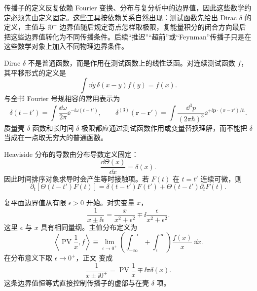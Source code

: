
传播子的定义反复依赖 Fourier 变换、分布与复分析中的边界值，因此这些数学约定必须先由定义固定。这些工具按依赖关系自然出现：测试函数先给出 Dirac $\delta$ 的定义，主值与 $\ii0^+$ 边界值随后规定奇点怎样取极限，复能量积分的闭合方向最后把这些边界值转化为不同传播条件。后续“推迟”“超前”或“Feynman”传播子只是在这些数学对象上加入不同物理边界条件。

Dirac $\delta$ 不是普通函数，而是作用在测试函数上的线性泛函。对连续测试函数 $f$，其平移形式的定义是
\begin{equation}
 \boxed{
 \int\dd y\,\delta(x-y)f(y)=f(x).}
 \label{eq:delta-def-action-r13}
\end{equation}
与全书 Fourier 号规相容的常用表示为
\begin{equation}
 \boxed{
 \delta(t-t')
 =\int\frac{\dd\omega}{2\pi}\ee^{-\ii\omega(t-t')},
 \qquad
 \delta^{(3)}(\mathbf r-\mathbf r')
 =\int\frac{\dd^3 p}{(2\pi\hbar)^3}
 \ee^{+\ii\mathbf p\cdot(\mathbf r-\mathbf r')/\hbar}.}
 \label{eq:delta-fourier-representation-dp68}
\end{equation}
质量壳 $\delta$ 函数和长时间 $\delta$ 极限都应通过测试函数作用或变量替换理解，而不能把 $\delta$ 当成在一点取无穷大的普通函数。

Heaviside 分布的导数由分布导数定义固定：
\begin{equation}
 \boxed{\frac{\dd\Theta(x)}{\dd x}=\delta(x).}
 \label{eq:heaviside-delta-dp68}
\end{equation}
因此时间排序对象求导时会产生等时接触项。若 $F(t)$ 在 $t=t'$ 连续可微，则
\begin{equation}
 \boxed{
 \partial_t[\Theta(t-t')F(t)]
 =\delta(t-t')F(t')
 +\Theta(t-t')\partial_tF(t).}
 \label{eq:theta-product-derivative-dp68}
\end{equation}

复平面边界值从有限 $\epsilon>0$ 开始。对实变量 $x$，
\begin{equation}
 \boxed{
 \frac1{x\pm\ii\epsilon}
 =\frac{x}{x^2+\epsilon^2}
 \mp\ii\frac{\epsilon}{x^2+\epsilon^2}.}
 \label{eq:plemelj-split-r13}
\end{equation}
这里 $\epsilon$ 与 $x$ 具有相同量纲。主值分布定义为
\begin{equation}
 \boxed{
 \left\langle\operatorname{PV}\frac1x,f\right\rangle
 \equiv\lim_{\epsilon\to0^+}
 \left(\int_{-\infty}^{-\epsilon}+\int_{\epsilon}^{\infty}\right)
 \frac{f(x)}x\,\dd x.}
 \label{eq:principal-value-definition-dp68}
\end{equation}
在分布意义下取 $\epsilon\to0^+$，正文 变成
\begin{equation}
 \boxed{
 \frac1{x\pm\ii0^+}
 =\operatorname{PV}\frac1x\mp\ii\pi\delta(x).}
 \label{eq:sokhotski-plemelj-dp68}
\end{equation}
这条边界值恒等式直接控制传播子的虚部与在壳 $\delta$ 项。

